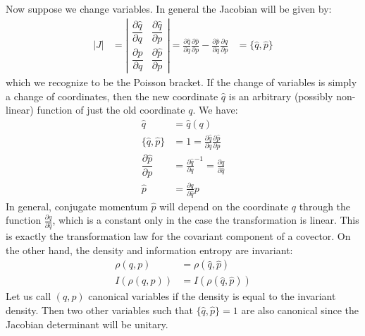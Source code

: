 \documentclass[11pt]{elsarticle}
\begin{document}
Now suppose we change variables. In general the Jacobian will be given by:
\begin{equation}
\label{Poisson}
\begin{aligned}
|J| &= \left| \begin{matrix}
\dfrac{\partial \hat{q}}{\partial q} & \dfrac{\partial \hat{q}}{\partial p} \\[2.2ex]
\dfrac{\partial \hat{p}}{\partial q} & \dfrac{\partial \hat{p}}{\partial p} \end{matrix} \right| = \frac{\partial \hat{q}}{\partial q} \frac{\partial \hat{p}}{\partial p} - \frac{\partial \hat{p}}{\partial q} \frac{\partial \hat{q}}{\partial p} &= \{\hat{q}, \hat{p}\}
\end{aligned}
\end{equation}
which we recognize to be the Poisson bracket. If the change of variables is simply a change of coordinates, then the new coordinate $\hat{q}$ is an arbitrary (possibly non-linear) function of just the old coordinate $q$. We have:
\begin{equation}
\label{coordinate_change}
\begin{aligned}
\hat{q} &= \hat{q}(q) \\
\{\hat{q}, \hat{p}\} &= 1 = \frac{\partial \hat{q}}{\partial q} \frac{\partial \hat{p}}{\partial p} \\
\dfrac{\partial \hat{p}}{\partial p} &= \frac{\partial \hat{q}}{\partial q} ^{-1} = \frac{\partial q}{\partial \hat{q}} \\
\hat{p} &= \frac{\partial q}{\partial \hat{q}} p
\end{aligned}
\end{equation}
In general, conjugate momentum $\hat{p}$ will depend on the coordinate $q$ through the function $\frac{\partial q}{\partial \hat{q}}$, which is a constant only in the case the transformation is linear. This is exactly the transformation law for the covariant component of a covector. On the other hand, the density and information entropy are invariant:
\begin{equation}
\label{density_invariance}
\begin{aligned}
\rho(q,p) &= \rho(\hat{q}, \hat{p}) \\
I(\rho(q,p)) &= I(\rho(\hat{q},\hat{p}))
\end{aligned}
\end{equation}
Let us call $(q,p)$ canonical variables if the density is equal to the invariant density. Then two other variables such that $\{\hat{q}, \hat{p}\}=1$ are also canonical since the Jacobian determinant will be unitary.
\end{document}
